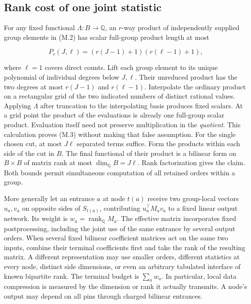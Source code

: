 \documentclass[
  11pt,
]{article}
\begin{document}
\subsection{Rank cost of one joint
statistic}\label{rank-cost-of-one-joint-statistic}

For any fixed functional \(\Lambda:B\to\mathbb Q\), an \(r\)-way product
of independently supplied group elements in (M.2) has scalar full-group
product length at most

\[
 P_r(J,\ell)=(r(J-1)+1)(r(\ell-1)+1),
\tag{M.3}
\]

where \(\ell=1\) covers direct counts. Lift each group element to its
unique polynomial of individual degrees below \(J,\ell\). Their
unreduced product has the two degrees at most \(r(J-1)\) and
\(r(\ell-1)\). Interpolate the ordinary product on a rectangular grid of
the two indicated numbers of distinct rational values. Applying
\(\Lambda\) after truncation to the interpolating basis produces fixed
scalars. At a grid point the product of the evaluations is already one
full-group scalar product. Evaluation itself need not preserve
multiplication in the \emph{quotient}. This calculation proves (M.3)
without making that false assumption. For the single chosen cut, at most
\(J\ell\) separated terms suffice. Form the products within each side of
the cut in \(B\). The final functional of their product is a bilinear
form on \(B\times B\) of matrix rank at most
\(\dim_{\mathbb Q}B=J\ell\). Rank factorization gives the claim. Both
bounds permit simultaneous computation of all retained orders within a
group.

More generally let an entrance \(a\) at node \(t(a)\) receive two
group-local vectors \(u_a,v_a\) on opposite sides of \(S_{t(a)}\),
contributing \(u_a^\top M_a v_a\) to a fixed linear output network. Its
weight is \(w_a=\operatorname{rank}_{\mathbb Q}M_a\). The effective
matrix incorporates fixed postprocessing, including the joint use of the
same entrance by several output orders. When several fixed bilinear
coefficient matrices act on the same two inputs, combine their terminal
coefficients first and take the rank of the resulting matrix. A
different representation may use smaller orders, different statistics at
every node, distinct side dimensions, or even an arbitrary tabulated
interface of known bipartite rank. The terminal budget is
\(\sum_a w_a\). In particular, local data compression is measured by the
dimension or rank it actually transmits. A node's output may depend on
all pins through charged bilinear entrances.
\end{document}
